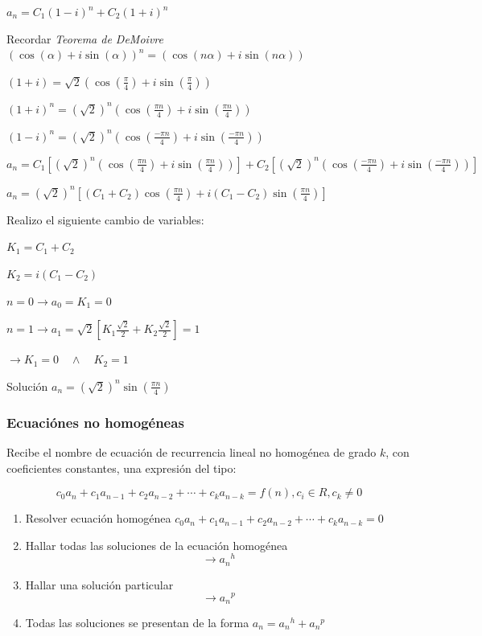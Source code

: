 \begin{itemize}
	$a_n= C_1 (1-i)^n + C_2 (1+i)^n$
	
	Recordar \emph{Teorema de DeMoivre} $( \cos(\alpha) + i \sin( \alpha))^n = ( \cos(n \alpha) + i \sin(n \alpha))$
	
	$(1+i) = \sqrt{2} \left(\cos(\frac{\pi}{4}) + i \sin(\frac{\pi}{4}) \right)$
	
	$(1+i)^n = (\sqrt{2})^n \left(\cos(\frac{\pi n}{4}) + i \sin(\frac{\pi n}{4}) \right)$
	
	$(1-i)^n = (\sqrt{2})^n \left(\cos(\frac{ - \pi n}{4}) + i \sin(\frac{- \pi n}{4}) \right)$
	
	$a_n = C_1 \left[(\sqrt{2})^n \left(\cos(\frac{\pi n}{4}) + i \sin(\frac{\pi n}{4}) \right) \right] + C_2 \left[ (\sqrt{2})^n \left(\cos(\frac{ - \pi n}{4}) + i \sin(\frac{- \pi n}{4}) \right)\right]$ 
	
	$a_n = (\sqrt{2})^n \left[ (C_1 + C_2) \cos(\frac{\pi n}{4}) + i (C_1 - C_2) \sin(\frac{\pi n}{4}) \right]$
	
	Realizo el siguiente cambio de variables:
	
	$K_1 = C_1 + C_2$
	
	$K_2 = i (C_1 - C_2)$
	
	$n=0 \rightarrow a_0 = K_1 = 0$
	
	$n=1 \rightarrow a_1 = \sqrt{2} \left[K_1 \frac{\sqrt{2}}{2} + K_2 \frac{\sqrt{2}}{2}\right] = 1$
	
	$\rightarrow K_1 = 0 \quad \wedge \quad K_2 =1$
	
	Solución $a_n = (\sqrt{2})^n \sin(\frac{\pi n}{4})$
\end{itemize}

\subsubsection{Ecuaciónes no homogéneas}
Recibe el nombre de ecuación de recurrencia lineal no homogénea de grado $k$, con coeficientes constantes, una expresión del tipo:

\begin{equation*}
	c_0a_n + c_1a_{n-1} + c_2a_{n-2} +\cdots+ c_ka_{n-k} =f(n) , c_i\in R , c_k \ne 0
\end{equation*}

\begin{enumerate}
	\item Resolver ecuación homogénea $c_0a_n + c_1a_{n-1} + c_2a_{n-2} +\cdots+ c_ka_{n-k} =0$
	\item Hallar todas las soluciones de la ecuación homogénea
	\begin{equation*}
		\rightarrow {a_n}^h
	\end{equation*}
	\item Hallar una solución particular
	\begin{equation*}
		\rightarrow {a_n}^p
	\end{equation*}
	\item Todas las soluciones se presentan de la forma $a_n = {a_n}^h + {a_n}^p$
\end{enumerate}

